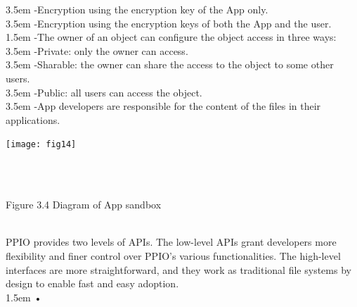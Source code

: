\documentclass[10pt,a4paper]{article}
\begin{document}
\hangindent 3.5em
\noindent   
-\quad Encryption using the encryption key of the App only.
  \vspace{-1em}
\\

\hangindent 3.5em
\noindent   
-\quad Encryption using the encryption keys of both the App and the user.  
  \vspace{-1em}
\\

\hangindent 1.5em
\noindent   
-\quad The owner of an object can configure the object access in three ways:
  \vspace{-1em}
\\

\hangindent 3.5em
\noindent   
-\quad Private: only the owner can access.
  \vspace{-1em}
\\

\hangindent 3.5em
\noindent   
-\quad Sharable: the owner can share the access to the object to some other users.
  \vspace{-1em}
\\

\hangindent 3.5em
\noindent   
-\quad Public: all users can access the object.
  \vspace{-1em}
\\

\hangindent 3.5em
\noindent   
-\quad App developers are responsible for the content of the files in their applications.
  \vspace{-0.5em}
\\

\noindent  
\centerline{\texttt{[image: fig14]}}
\\\\ \centerline{{ Figure 3.4 Diagram of App sandbox}}%
  \vspace{-0.5em}
\\
 
\noindent  
PPIO provides two levels of APIs. The low-level APIs grant developers more flexibility and finer control over PPIO’s various functionalities. The high-level interfaces are more straightforward, and they work as traditional file systems by design to enable fast and easy adoption.
  \vspace{-0.5em}
\\

\hangindent 1.5em
\noindent   
•
  \vspace{-0.8em}
\\
\end{document}
